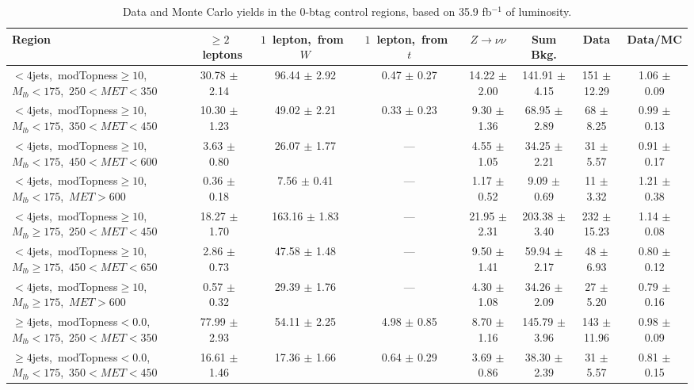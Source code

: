 \begin{table}
\centering
\scriptsize
\caption{Data and Monte Carlo yields in the 0-btag control regions,
  based on 35.9 fb$^{-1}$ of luminosity.}
\label{tab:stop:1lw:cryields}
\begin{tabular}{|l|c c c c c|c|c|}
\hline
Region  & $\ge2$~leptons & $1$~lepton,~from~$W$ & $1$~lepton,~from~$t$ & $Z\rightarrow\nu\nu$ & Sum Bkg. & Data & Data/MC \\*
\hline \hline
$<4$jets,~modTopness$\ge10$,~$M_{lb}<175$,~$250<MET<350$  & 30.78 $\pm$ 2.14  & 96.44 $\pm$ 2.92  & 0.47 $\pm$ 0.27  & 14.22 $\pm$ 2.00  & 141.91 $\pm$ 4.15  & 151 $\pm$ 12.29  & 1.06 $\pm$ 0.09 \\*
$<4$jets,~modTopness$\ge10$,~$M_{lb}<175$,~$350<MET<450$  & 10.30 $\pm$ 1.23  & 49.02 $\pm$ 2.21  & 0.33 $\pm$ 0.23  & 9.30 $\pm$ 1.36  & 68.95 $\pm$ 2.89  & 68 $\pm$ 8.25  & 0.99 $\pm$ 0.13 \\*
$<4$jets,~modTopness$\ge10$,~$M_{lb}<175$,~$450<MET<600$  & 3.63 $\pm$ 0.80  & 26.07 $\pm$ 1.77  & ---  & 4.55 $\pm$ 1.05  & 34.25 $\pm$ 2.21  & 31 $\pm$ 5.57  & 0.91 $\pm$ 0.17 \\*
$<4$jets,~modTopness$\ge10$,~$M_{lb}<175$,~$MET>600$  & 0.36 $\pm$ 0.18  & 7.56 $\pm$ 0.41  & ---  & 1.17 $\pm$ 0.52  & 9.09 $\pm$ 0.69  & 11 $\pm$ 3.32  & 1.21 $\pm$ 0.38 \\*
\hline
$<4$jets,~modTopness$\ge10$,~$M_{lb}\ge175$,~$250<MET<450$  & 18.27 $\pm$ 1.70  & 163.16 $\pm$ 1.83  & ---  & 21.95 $\pm$ 2.31  & 203.38 $\pm$ 3.40  & 232 $\pm$ 15.23  & 1.14 $\pm$ 0.08 \\*
$<4$jets,~modTopness$\ge10$,~$M_{lb}\ge175$,~$450<MET<650$  & 2.86 $\pm$ 0.73  & 47.58 $\pm$ 1.48  & ---  & 9.50 $\pm$ 1.41  & 59.94 $\pm$ 2.17  & 48 $\pm$ 6.93  & 0.80 $\pm$ 0.12 \\*
$<4$jets,~modTopness$\ge10$,~$M_{lb}\ge175$,~$MET>600$  & 0.57 $\pm$ 0.32  & 29.39 $\pm$ 1.76  & ---  & 4.30 $\pm$ 1.08  & 34.26 $\pm$ 2.09  & 27 $\pm$ 5.20  & 0.79 $\pm$ 0.16 \\*
\hline
$\ge4$jets,~modTopness$<0.0$,~$M_{lb}<175$,~$250<MET<350$  & 77.99 $\pm$ 2.93  & 54.11 $\pm$ 2.25  & 4.98 $\pm$ 0.85  & 8.70 $\pm$ 1.16  & 145.79 $\pm$ 3.96  & 143 $\pm$ 11.96  & 0.98 $\pm$ 0.09 \\*
$\ge4$jets,~modTopness$<0.0$,~$M_{lb}<175$,~$350<MET<450$  & 16.61 $\pm$ 1.46  & 17.36 $\pm$ 1.66  & 0.64 $\pm$ 0.29  & 3.69 $\pm$ 0.86  & 38.30 $\pm$ 2.39  & 31 $\pm$ 5.57  & 0.81 $\pm$ 0.15 \\*

\end{tabular}
\end{table}
